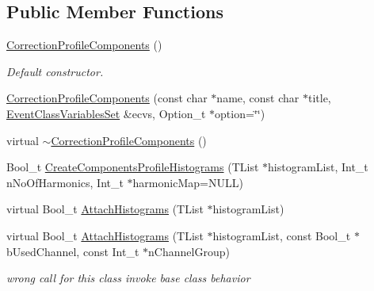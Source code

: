 \subsection*{Public Member Functions}
\begin{DoxyCompactItemize}
\item 
\mbox{\label{classQn_1_1CorrectionProfileComponents_ab682b61821f6efad703fb2043b92c086}} 
\mbox{\hyperlink{classQn_1_1CorrectionProfileComponents_ab682b61821f6efad703fb2043b92c086}{Correction\+Profile\+Components}} ()
\begin{DoxyCompactList}\small\item\em Default constructor. \end{DoxyCompactList}\item 
\mbox{\hyperlink{classQn_1_1CorrectionProfileComponents_afb4978830f231d9eeff316e013e7d07e}{Correction\+Profile\+Components}} (const char $\ast$name, const char $\ast$title, \mbox{\hyperlink{classQn_1_1EventClassVariablesSet}{Event\+Class\+Variables\+Set}} \&ecvs, Option\+\_\+t $\ast$option=\char`\"{}\char`\"{})
\item 
virtual \mbox{\hyperlink{classQn_1_1CorrectionProfileComponents_aefaf9152720bce6f1f9172c38732e90c}{$\sim$\+Correction\+Profile\+Components}} ()
\item 
Bool\+\_\+t \mbox{\hyperlink{classQn_1_1CorrectionProfileComponents_a4f965b6d5d75fac426b94210b0e3bec1}{Create\+Components\+Profile\+Histograms}} (T\+List $\ast$histogram\+List, Int\+\_\+t n\+No\+Of\+Harmonics, Int\+\_\+t $\ast$harmonic\+Map=N\+U\+LL)
\item 
virtual Bool\+\_\+t \mbox{\hyperlink{classQn_1_1CorrectionProfileComponents_adefa34cb026125ea0d52966c470f81af}{Attach\+Histograms}} (T\+List $\ast$histogram\+List)
\item 
\mbox{\label{classQn_1_1CorrectionProfileComponents_a5b162699ea0d37e4c41af546285b476c}} 
virtual Bool\+\_\+t \mbox{\hyperlink{classQn_1_1CorrectionProfileComponents_a5b162699ea0d37e4c41af546285b476c}{Attach\+Histograms}} (T\+List $\ast$histogram\+List, const Bool\+\_\+t $\ast$b\+Used\+Channel, const Int\+\_\+t $\ast$n\+Channel\+Group)
\begin{DoxyCompactList}\small\item\em wrong call for this class invoke base class behavior \end{DoxyCompactList}\item 

\end{DoxyCompactItemize}
